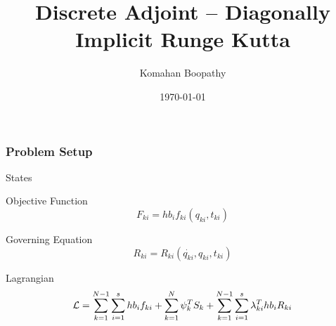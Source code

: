 \documentclass{beamer}
\title[\hspace{-0.2cm} DIRK Adjoint]
{
Discrete Adjoint -- Diagonally Implicit Runge Kutta
}
\author[Komahan Boopathy]
{
  \Large {Komahan Boopathy}\\
}
\institute
{
 \large Georgia Institute of Technology\\
 School of Aerospace Engineering\\
Atlanta, GA
}
\date
{
\small \today
}
\begin{document}
\begin{frame}
  \titlepage
\end{frame}


\begin{frame}
\frametitle{Problem Setup}

\begin{block}{States}
\end{block}

\begin{block}{Objective Function}
  \begin{equation}\nonumber
    F_{ki} =  h b_i f_{ki}(q_{ki},t_{ki})
  \end{equation}
\end{block}

\begin{block}{Governing Equation}
  \begin{equation}\nonumber
    R_{ki} = R_{ki}(\dot{q_{ki}},q_{ki},t_{ki})
  \end{equation}
\end{block}

\begin{block}{Lagrangian}
  \begin{equation}\nonumber
    {\cal{L}} = \sum_{k=1}^{N-1} \sum_{i=1}^s h b_i f_{ki} + \sum_{k=1}^N \psi_k^T S_k+  \sum_{k=1}^{N-1} \sum_{i=1}^s\lambda_{ki}^T  h b_i R_{ki}
  \end{equation}
\end{block}

\end{frame}
\end{document}
